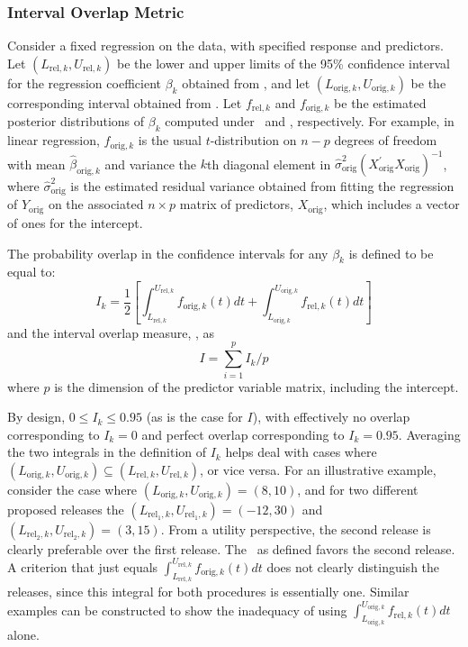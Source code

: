\subsubsection{Interval Overlap Metric}
Consider a fixed regression on the data, with specified response
and predictors. Let $(L_{\mathrm{rel},k}, U_{\mathrm{rel},k})$ be
the lower and upper limits of the 95\% confidence interval for the
regression coefficient $\beta_{k}$ obtained from \DBREL, and let
$(L_{\mathrm{orig},k}, U_{\mathrm{orig},k})$ be the corresponding
interval obtained from \DBORIG. Let $f_{\mathrm{rel},k}$ and
$f_{\mathrm{orig},k}$ be the estimated posterior distributions of
$\beta_k$ computed under \DBREL\ and \DBORIG, respectively.  For
example, in linear regression, $f_{\mathrm{orig},k}$ is the usual
$t$-distribution on $n-p$ degrees of freedom with mean
$\hat{\beta}_{\mathrm{orig},k}$ and variance the $k$th diagonal
element in
$\hat{\sigma}^2_{\mathrm{orig}}\left(X^{'}_{\mathrm{orig}}
X_{\mathrm{orig}}\right)^{-1}$, where
$\hat{\sigma}^2_{\mathrm{orig}}$ is the estimated residual
variance obtained from fitting the regression of
$Y_{\mathrm{orig}}$ on the associated $n \times p$ matrix of
predictors, $X_{\mathrm{orig}}$, which includes a vector of ones
for the intercept.

The probability overlap in the confidence intervals for
any $\beta_{k}$ \citep{kkors06} is defined to be equal to:
\begin{equation}
I_k = \frac{1}{2}
\left[\int_{L_{\mathrm{rel},k}}^{U_{\mathrm{rel},k}}
f_{\mathrm{orig},k}(t) dt +
\int_{L_{\mathrm{orig},k}}^{U_{\mathrm{orig},k}}
f_{\mathrm{rel},k}(t) dt \right]
\end{equation}
and the interval overlap measure, \IO, as
\begin{equation}
I = \sum_{i=1}^p I_k / p
\end{equation}
where $p$ is the dimension of the predictor variable matrix, including
the intercept.

By design, $0 \leq I_k \leq 0.95$ (as is the case for $I$), with
effectively no overlap corresponding to $I_k =0$ and perfect
overlap corresponding to $I_k = 0.95$.  Averaging the two
integrals in the definition of $I_k$ helps deal with cases where
$(L_{\mathrm{orig},k}, U_{\mathrm{orig},k}) \subseteq
(L_{\mathrm{rel},k}, U_{\mathrm{rel},k})$, or vice versa.  For an
illustrative example, consider the case where
$(L_{\mathrm{orig},k}, U_{\mathrm{orig},k}) = (8, 10)$, and for
two different proposed releases the $(L_{\mathrm{rel_1},k},
U_{\mathrm{rel_1},k})=(-12, 30)$ and $(L_{\mathrm{rel_2},k},
U_{\mathrm{rel_2},k})=(3, 15)$. From a utility perspective, the
second release is clearly preferable over the first release. The
\IO\ as defined favors the second release.  A criterion that just
equals $\int_{L_{\mathrm{rel},k}}^{U_{\mathrm{rel},k}}
f_{\mathrm{orig},k}(t) dt$ does not clearly distinguish the
releases, since this integral for both procedures is essentially
one. Similar examples can be constructed to show the inadequacy of
using $\int_{L_{\mathrm{orig},k}}^{U_{\mathrm{orig},k}}
f_{\mathrm{rel},k}(t) dt$ alone.

